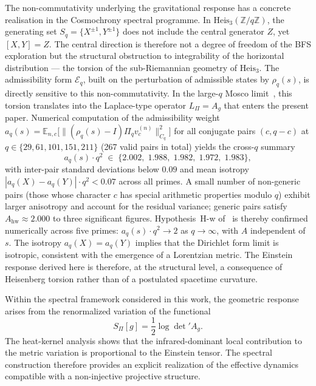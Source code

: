   \begin{remark}
    The non-commutativity underlying the gravitational response has a concrete
    realisation in the Cosmochrony spectral programme.
    In $\mathrm{Heis}_3(\mathbb{Z}/q\mathbb{Z})$, the generating set
    $S_q = \{X^{\pm 1}, Y^{\pm 1}\}$ does not include the central generator $Z$,
    yet $[X, Y] = Z$.
    The central direction is therefore not a degree of freedom of the BFS
    exploration but the structural obstruction to integrability of the horizontal
    distribution --- the torsion of the sub-Riemannian geometry of
    $\mathrm{Heis}_3$.
    The admissibility form $\mathcal{E}_q$, built on the perturbation of admissible
    states by $\rho_q(s)$, is directly sensitive to this non-commutativity.
    In the large-$q$ Mosco limit~\cite{Beau2026Q5a}, this torsion translates into
    the Laplace-type operator $L_\Pi = A_g$ that enters the present paper.
    Numerical computation of the admissibility weight
    $a_q(s) = \mathbb{E}_{n,c}\bigl[\|(\rho_q(s)-I)\Pi_q v_c^{(n)}\|^2_{C_q}\bigr]$
    for all conjugate pairs $(c,q-c)$ at $q \in \{29, 61, 101, 151, 211\}$
    (267 valid pairs in total) yields the cross-$q$ summary
    \[
      a_q(s)\cdot q^2 \;\in\;
      \{2.002,\; 1.988,\; 1.982,\; 1.972,\; 1.983\},
    \]
    with inter-pair standard deviations below $0.09$ and mean isotropy
    $|a_q(X)-a_q(Y)|\cdot q^2 < 0.07$ across all primes.
    A small number of non-generic pairs (those whose character $c$
    has special arithmetic properties modulo $q$) exhibit larger
    anisotropy and account for the residual variance;
    generic pairs satisfy $A_{\mathrm{hw}}\approx 2.000$ to three
    significant figures.
    Hypothesis~H-w of~\cite{Beau2026Q5a} is thereby confirmed numerically
    across five primes: $a_q(s)\cdot q^2 \to 2$ as $q\to\infty$,
    with $A$ independent of $s$.
    The isotropy $a_q(X)=a_q(Y)$ implies that the Dirichlet form limit
    is isotropic, consistent with the emergence of a Lorentzian metric.
    The Einstein response derived here is therefore, at the structural level,
    a consequence of Heisenberg torsion rather than of a postulated spacetime
    curvature.
  \end{remark}

  Within the spectral framework considered in this work, the geometric response
  arises from the renormalized variation of the functional
  \[
    S_\Pi[g] = \frac12 \log \det{}' A_g .
  \]
  The heat-kernel analysis shows that the infrared-dominant local contribution
  to the metric variation is proportional to the Einstein tensor.
  The spectral construction therefore provides an explicit realization of the
  effective dynamics compatible with a non-injective projective structure.

